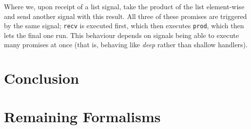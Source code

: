 \documentclass[msc,deptreport,cs]{infthesis} %
\newcommand{\code}[1]{\lstinline{#1}}
\begin{document}
\noindent Where we, upon receipt of a list signal, take the product of the list
element-wise and send another signal with this result. All three of these
promises are triggered by the same signal; \code{recv} is executed first, which
then executes \code{prod}, which then lets the final one run. This behaviour
depends on signals being able to execute many promises at once (that is,
behaving like \emph{deep} rather than shallow handlers).




\chapter{Conclusion}








\appendix

\chapter{Remaining Formalisms}
\end{document}
